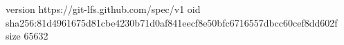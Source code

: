 version https://git-lfs.github.com/spec/v1
oid sha256:81d4961675d81cbe4230b71d0af841eecf8e50bfc6716557dbcc60cef8dd602f
size 65632

